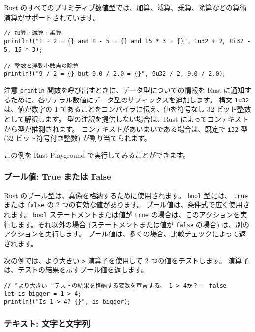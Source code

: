 Rust のすべてのプリミティブ数値型では、加算、減算、乗算、除算などの算術演算がサポートされています。


\begin{lstlisting}[numbers=none]
// 加算・減算・乗算
println!("1 + 2 = {} and 8 - 5 = {} and 15 * 3 = {}", 1u32 + 2, 8i32 - 5, 15 * 3);

// 整数と浮動小数点の除算
println!("9 / 2 = {} but 9.0 / 2.0 = {}", 9u32 / 2, 9.0 / 2.0);
\end{lstlisting}

\begin{itembox}[l]{注意}
\texttt{println} 関数を呼び出すときに、データ型についての情報を Rust に通知するために、各リテラル数値にデータ型のサフィックスを追加します。 構文 \texttt{1u32} は、値が数字の 1 であることをコンパイラに伝え、値を符号なし 32 ビット整数として解釈します。   型の注釈を提供しない場合は、Rust によってコンテキストから型が推測されます。 コンテキストがあいまいである場合は、既定で \texttt{i32} 型 (32 ビット符号付き整数) が割り当てられます。
\end{itembox}

この例を Rust Playground で実行してみることができます。

\subsubsection{ブール値: True または False}

Rust のブール型は、真偽を格納するために使用されます。 \texttt{bool} 型には、 \texttt{true} または \texttt{false} の 2 つの有効な値があります。 ブール値は、条件式で広く使用されます。 \texttt{bool} ステートメントまたは値が \texttt{true} の場合は、このアクションを実行します。それ以外の場合 (ステートメントまたは値が \texttt{false} の場合) は、別のアクションを実行します。 ブール値は、多くの場合、比較チェックによって返されます。

次の例では、より大きい \texttt{>} 演算子を使用して 2 つの値をテストします。 演算子は、テストの結果を示すブール値を返します。

\begin{lstlisting}[numbers=none]
// "より大きい "テストの結果を格納する変数を宣言する。 1 > 4か？-- false
let is_bigger = 1 > 4;
println!("Is 1 > 4? {}", is_bigger);
\end{lstlisting}

\subsubsection{テキスト: 文字と文字列}

